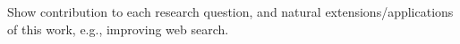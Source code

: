 %


Show contribution to each research question, and natural extensions/applications of this work, e.g., improving web search.